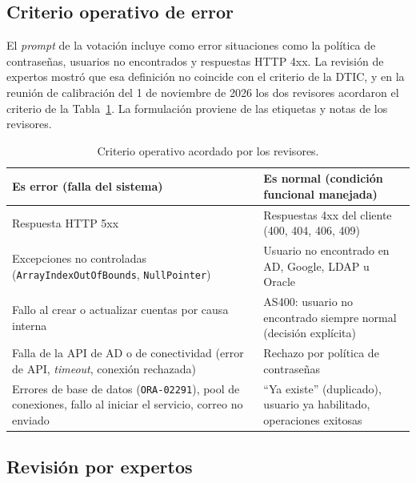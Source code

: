 \subsection{Criterio operativo de error}\label{sec:met_criterio}

El \textit{prompt} de la votación incluye como error situaciones como la política de contraseñas, usuarios no encontrados y respuestas HTTP 4xx. La revisión de expertos mostró que esa definición no coincide con el criterio de la DTIC, y en la reunión de calibración del 1 de noviembre de 2026 los dos revisores acordaron el criterio de la Tabla~\ref{tab:met_criterio}. La formulación proviene de las etiquetas y notas de los revisores. %

\begin{table}[H]
\centering
\caption{Criterio operativo acordado por los revisores.}
\label{tab:met_criterio}
\small
\begin{tabular}{@{}p{7.2cm}p{7.2cm}@{}}
\toprule
\textbf{Es error (falla del sistema)} & \textbf{Es normal (condición funcional manejada)} \\
\midrule
Respuesta HTTP 5xx & Respuestas 4xx del cliente (400, 404, 406, 409) \\
Excepciones no controladas (\texttt{ArrayIndexOutOfBounds}, \texttt{NullPointer}) & Usuario no encontrado en AD, Google, LDAP u Oracle \\
Fallo al crear o actualizar cuentas por causa interna & AS400: usuario no encontrado siempre normal (decisión explícita) \\
Falla de la API de AD o de conectividad (error de API, \textit{timeout}, conexión rechazada) & Rechazo por política de contraseñas \\
Errores de base de datos (\texttt{ORA-02291}), pool de conexiones, fallo al iniciar el servicio, correo no enviado & ``Ya existe'' (duplicado), usuario ya habilitado, operaciones exitosas \\
\bottomrule
\end{tabular}
\normalsize
\end{table}

\subsection{Revisión por expertos}\label{subsec:met_expertos}


